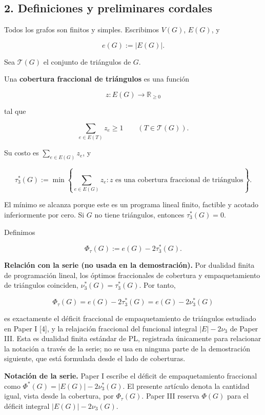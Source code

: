 \documentclass[spanish,11pt,a4paper]{article}
\begin{document}
\subsection{2. Definiciones y preliminares
cordales}\label{definiciones-y-preliminares-cordales}

Todos los grafos son finitos y simples. Escribimos \(V(G)\), \(E(G)\), y

\[
e(G):=|E(G)|.
\]

Sea \(\mathcal T(G)\) el conjunto de triángulos de \(G\).

Una \textbf{cobertura fraccional de triángulos} es una función

\[
z:E(G)\longrightarrow\mathbb R_{\ge0}
\]

tal que

\[
\sum_{e\in E(T)}z_e\ge1
\qquad
(T\in\mathcal T(G)).
\]

Su costo es \(\sum_{e\in E(G)}z_e\), y

\[
\tau_3^*(G)
:=
\min\left\{
\sum_{e\in E(G)}z_e:
z\text{ es una cobertura fraccional de triángulos}
\right\}.
\]

El mínimo se alcanza porque este es un programa lineal finito, factible
y acotado inferiormente por cero. Si \(G\) no tiene triángulos, entonces
\(\tau_3^*(G)=0\).

Definimos

\[
\Phi_\tau(G):=e(G)-2\tau_3^*(G).
\]

\textbf{Relación con la serie (no usada en la demostración).} Por
dualidad finita de programación lineal, los óptimos fraccionales de
cobertura y empaquetamiento de triángulos coinciden,
\(\nu_3^*(G)=\tau_3^*(G)\). Por tanto,

\[
\Phi_\tau(G)=e(G)-2\tau_3^*(G)=e(G)-2\nu_3^*(G)
\]

es exactamente el déficit fraccional de empaquetamiento de triángulos
estudiado en Paper I {[}4{]}, y la relajación fraccional del funcional
integral \(|E|-2\nu_3\) de Paper III. Esta es dualidad finita estándar
de PL, registrada únicamente para relacionar la notación a través de la
serie; no se usa en ninguna parte de la demostración siguiente, que está
formulada desde el lado de coberturas.

\textbf{Notación de la serie.} Paper I escribe el déficit de
empaquetamiento fraccional como \(\Phi^*(G)=|E(G)|-2\nu_3^*(G)\). El
presente artículo denota la cantidad igual, vista desde la cobertura,
por \(\Phi_\tau(G)\). Paper III reserva \(\Phi(G)\) para el déficit
integral \(|E(G)|-2\nu_3(G)\).
\end{document}
